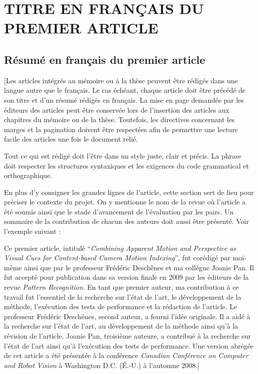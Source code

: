 
\chapter{TITRE EN FRANÇAIS DU PREMIER ARTICLE}

\section{Résumé en français du premier article}

[Les articles intégrés au mémoire ou à la thèse peuvent être rédigés dans une langue autre que le français. Le cas échéant, chaque article doit être précédé de son titre et d’un résumé rédigés en français. La mise en page demandée par les éditeurs des articles peut être conservée lors de l’insertion des articles aux chapitres du mémoire ou de la thèse. Toutefois, les directives concernant les marges et la pagination doivent être respectées afin de permettre une lecture facile des articles une fois le document relié.

Tout ce qui est rédigé doit l’être dans un style juste, clair et précis. La phrase doit respecter les structures syntaxiques et les exigences du code grammatical et orthographique.

En plus d’y consigner les grandes lignes de l’article, cette section sert de lieu pour préciser le contexte du projet. On y mentionne le nom de la revue où l’article a été soumis ainsi que le stade d’avancement de l’évaluation par les pairs. Un sommaire de la contribution de chacun des auteurs doit aussi être présenté. Voir l’exemple suivant :

Ce premier article, intitulé \enquote{\textit{Combining Apparent Motion and Perspective as Visual Cues for Content-based Camera Motion Indexing}}, fut corédigé par moi-même ainsi que par le professeur Frédéric Deschênes et ma collègue Joanie Pan. Il fut accepté pour publication dans sa version finale en 2009 par les éditeurs de la revue \textit{Pattern Recognition}. En tant que premier auteur, ma contribution à ce travail fut l’essentiel de la recherche sur l’état de l’art, le développement de la méthode, l’exécution des tests de performance et la rédaction de l’article. Le professeur Frédéric Deschênes, second auteur, a fourni l’idée originale. Il a aidé à la recherche sur l’état de l’art, au développement de la méthode ainsi qu’à la révision de l’article. Joanie Pan, troisième auteure, a contribué à la recherche sur l’état de l’art ainsi qu’à l’exécution des tests de performance. Une version abrégée de cet article a été présentée à la conférence \textit{Canadian Conférence on Computer and Robot Vision} à Washington D.C. (É.-U.) à l’automne 2008.]

